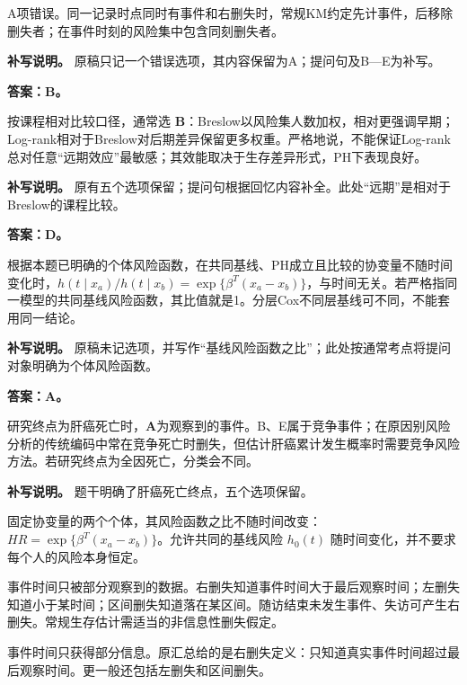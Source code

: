 A项错误。同一记录时点同时有事件和右删失时，常规KM约定先计事件，后移除删失者；在事件时刻的风险集中包含同刻删失者。

\textbf{补写说明。} 原稿只记一个错误选项，其内容保留为A；提问句及B---E为补写。



\textbf{答案：B。}

按课程相对比较口径，通常选 \textbf{B}：Breslow以风险集人数加权，相对更强调早期；Log-rank相对于Breslow对后期差异保留更多权重。严格地说，不能保证Log-rank总对任意``远期效应''最敏感；其效能取决于生存差异形式，PH下表现良好。

\textbf{补写说明。} 原有五个选项保留；提问句根据回忆内容补全。此处``远期''是相对于Breslow的课程比较。



\textbf{答案：D。}

根据本题已明确的个体风险函数，在共同基线、PH成立且比较的协变量不随时间变化时，\(h(t\mid x_a)/h(t\mid x_b)=\exp\{\beta^T(x_a-x_b)\}\)，与时间无关。若严格指同一模型的共同基线风险函数，其比值就是1。分层Cox不同层基线可不同，不能套用同一结论。

\textbf{补写说明。} 原稿未记选项，并写作``基线风险函数之比''；此处按通常考点将提问对象明确为个体风险函数。



\textbf{答案：A。}

研究终点为肝癌死亡时，\textbf{A}为观察到的事件。B、E属于竞争事件；在原因别风险分析的传统编码中常在竞争死亡时删失，但估计肝癌累计发生概率时需要竞争风险方法。若研究终点为全因死亡，分类会不同。

\textbf{补写说明。} 题干明确了肝癌死亡终点，五个选项保留。



固定协变量的两个个体，其风险函数之比不随时间改变：\(HR=\exp\{\beta^T(x_a-x_b)\}\)。允许共同的基线风险 \(h_0(t)\) 随时间变化，并不要求每个人的风险本身恒定。



事件时间只被部分观察到的数据。右删失知道事件时间大于最后观察时间；左删失知道小于某时间；区间删失知道落在某区间。随访结束未发生事件、失访可产生右删失。常规生存估计需适当的非信息性删失假定。



事件时间只获得部分信息。原汇总给的是右删失定义：只知道真实事件时间超过最后观察时间。更一般还包括左删失和区间删失。


